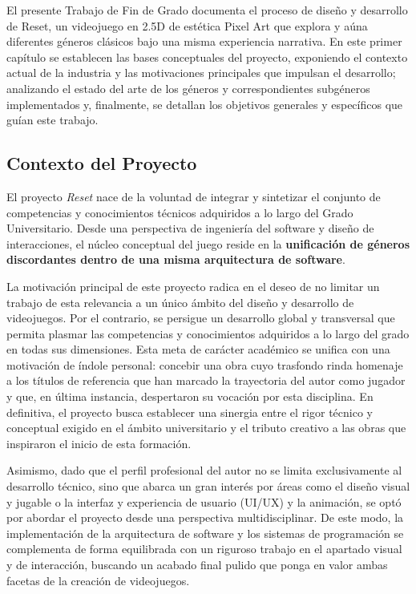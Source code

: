 El presente Trabajo de Fin de Grado documenta el proceso de diseño y desarrollo de Reset, un videojuego en 2.5D de estética Pixel Art que explora y aúna diferentes géneros clásicos bajo una misma experiencia narrativa. En este primer capítulo se establecen las bases conceptuales del proyecto, exponiendo el contexto actual de la industria y las motivaciones principales que impulsan el desarrollo; analizando el estado del arte de los géneros y correspondientes subgéneros implementados y, finalmente, se detallan los objetivos generales y específicos que guían este trabajo.


\subsection{Contexto del Proyecto}

El proyecto \textit{Reset} nace de la voluntad de integrar y sintetizar el conjunto de competencias y conocimientos técnicos adquiridos a lo largo del Grado Universitario. Desde una perspectiva de ingeniería del software y diseño de interacciones, el núcleo conceptual del juego reside en la \textbf{unificación de géneros discordantes dentro de una misma arquitectura de software}.

La motivación principal de este proyecto radica en el deseo de no limitar un trabajo de esta relevancia a un único ámbito del diseño y desarrollo de videojuegos. Por el contrario, se persigue un desarrollo global y transversal que permita plasmar las competencias y conocimientos adquiridos a lo largo del grado en todas sus dimensiones. Esta meta de carácter académico se unifica con una motivación de índole personal: concebir una obra cuyo trasfondo rinda homenaje a los títulos de referencia que han marcado la trayectoria del autor como jugador y que, en última instancia, despertaron su vocación por esta disciplina. En definitiva, el proyecto busca establecer una sinergia entre el rigor técnico y conceptual exigido en el ámbito universitario y el tributo creativo a las obras que inspiraron el inicio de esta formación.

Asimismo, dado que el perfil profesional del autor no se limita exclusivamente al desarrollo técnico, sino que abarca un gran interés por áreas como el diseño visual y jugable o la interfaz y experiencia de usuario (UI/UX) y la animación, se optó por abordar el proyecto desde una perspectiva multidisciplinar. De este modo, la implementación de la arquitectura de software y los sistemas de programación se complementa de forma equilibrada con un riguroso trabajo en el apartado visual y de interacción, buscando un acabado final pulido que ponga en valor ambas facetas de la creación de videojuegos.

